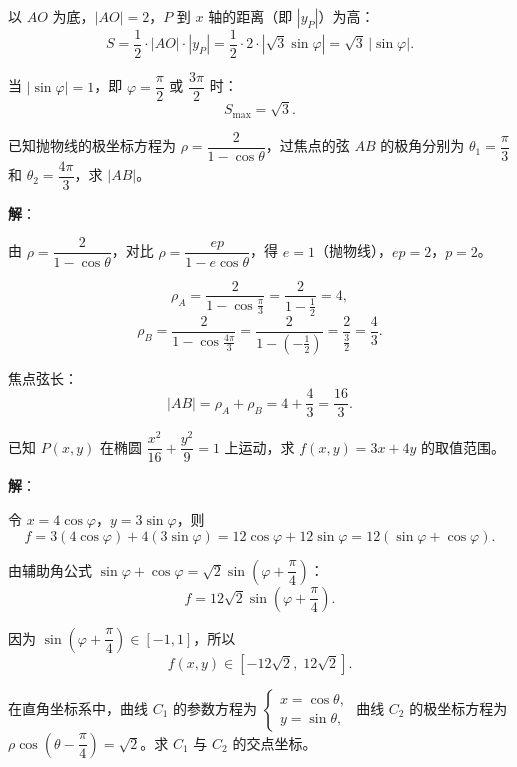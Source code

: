 \documentclass[12pt,a4paper]{ctexart}
\theoremstyle{definition}
\begin{document}
以 $AO$ 为底，$|AO|=2$，$P$ 到 $x$ 轴的距离（即 $|y_P|$）为高：
\[
  S = \frac{1}{2}\cdot|AO|\cdot|y_P| = \frac{1}{2}\cdot 2\cdot|\sqrt{3}\sin\varphi| = \sqrt{3}\,|\sin\varphi|.
\]

当 $|\sin\varphi|=1$，即 $\varphi=\dfrac{\pi}{2}$ 或 $\dfrac{3\pi}{2}$ 时：
\[
  S_{\max} = \boxed{\sqrt{3}}.
\]

\begin{application}
  已知抛物线的极坐标方程为 $\rho = \dfrac{2}{1-\cos\theta}$，过焦点的弦 $AB$ 的极角分别为 $\theta_1=\dfrac{\pi}{3}$ 和 $\theta_2=\dfrac{4\pi}{3}$，求 $|AB|$。
\end{application}

\textbf{解}：

由 $\rho = \dfrac{2}{1-\cos\theta}$，对比 $\rho = \dfrac{ep}{1-e\cos\theta}$，得 $e=1$（抛物线），$ep=2$，$p=2$。

\[
  \rho_A = \frac{2}{1-\cos\frac{\pi}{3}} = \frac{2}{1-\frac{1}{2}} = 4,
\]
\[
  \rho_B = \frac{2}{1-\cos\frac{4\pi}{3}} = \frac{2}{1-\left(-\frac{1}{2}\right)} = \frac{2}{\frac{3}{2}} = \frac{4}{3}.
\]

焦点弦长：
\[
  |AB| = \rho_A + \rho_B = 4 + \frac{4}{3} = \boxed{\frac{16}{3}}.
\]

\begin{application}
  已知 $P(x,y)$ 在椭圆 $\dfrac{x^2}{16}+\dfrac{y^2}{9}=1$ 上运动，求 $f(x,y)=3x+4y$ 的取值范围。
\end{application}

\textbf{解}：

令 $x = 4\cos\varphi$，$y = 3\sin\varphi$，则
\[
  f = 3(4\cos\varphi) + 4(3\sin\varphi) = 12\cos\varphi + 12\sin\varphi = 12(\sin\varphi+\cos\varphi).
\]

由辅助角公式 $\sin\varphi+\cos\varphi = \sqrt{2}\sin\!\left(\varphi+\dfrac{\pi}{4}\right)$：
\[
  f = 12\sqrt{2}\sin\!\left(\varphi+\frac{\pi}{4}\right).
\]

因为 $\sin\!\left(\varphi+\dfrac{\pi}{4}\right)\in[-1,1]$，所以
\[
  \boxed{f(x,y) \in [-12\sqrt{2},\;12\sqrt{2}].}
\]

\begin{application}
  在直角坐标系中，曲线 $C_1$ 的参数方程为 $\begin{cases} x=\cos\theta, \\ y=\sin\theta, \end{cases}$ 曲线 $C_2$ 的极坐标方程为 $\rho\cos\!\left(\theta-\dfrac{\pi}{4}\right)=\sqrt{2}$。求 $C_1$ 与 $C_2$ 的交点坐标。
\end{application}
\end{document}
